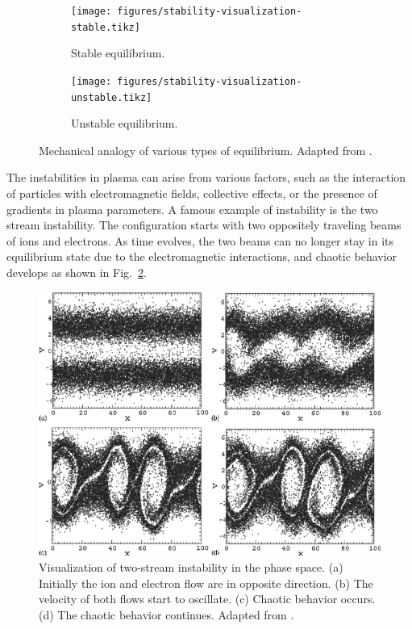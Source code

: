 \begin{figure}[htbp]
	\centering
	\begin{subfigure}[b]{0.5\textwidth}
		\centering
		\texttt{[image: figures/stability-visualization-stable.tikz]}
		\caption{Stable equilibrium.}
	\end{subfigure}%
	\begin{subfigure}[b]{0.5\textwidth}
		\centering
		\texttt{[image: figures/stability-visualization-unstable.tikz]}
		\caption{Unstable equilibrium.}
	\end{subfigure}
	\caption{Mechanical analogy of various types of equilibrium. Adapted from \cite{chen_introduction_2016}.}
	\label{fig:stability-visualization}
\end{figure}


The instabilities in plasma can arise from various factors, such as the interaction of particles with electromagnetic fields, collective effects, or the presence of gradients in plasma parameters. A famous example of instability is the two stream instability. The configuration starts with two oppositely traveling beams of ions and electrons. As time evolves, the two beams can no longer stay in its equilibrium state due to the electromagnetic interactions, and chaotic behavior develops as shown in Fig.~\ref{fig:two-stream-instability}.

\begin{figure}[htbp]
	\centering
	\includegraphics[width=0.7\linewidth]{figures/two-stream-instability}
	\caption{Visualization of two-stream instability in the phase space. (a) Initially the ion and electron flow are in opposite direction. (b) The velocity of both flows start to oscillate. (c) Chaotic behavior occurs. (d) The chaotic behavior continues. Adapted from \cite{ha_nonlinear_2011}.}
	\label{fig:two-stream-instability}
\end{figure}

